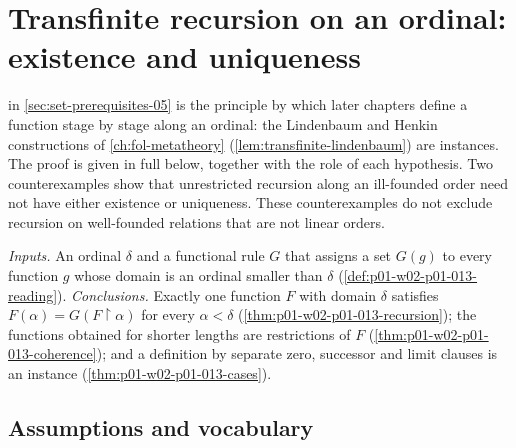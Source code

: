 \section{Transfinite recursion on an ordinal: existence and uniqueness}
\label{sec:p01-w02-p01-013-transfinite-recursion}

 in \cref{sec:set-prerequisites-05} is the
principle by which later chapters define a function stage by stage along an
ordinal: the Lindenbaum and Henkin constructions of
\cref{ch:fol-metatheory} (\cref{lem:transfinite-lindenbaum}) are instances.
The proof is given in full below, together with the role of each hypothesis.
Two counterexamples show that unrestricted recursion along an ill-founded
order need not have either existence or uniqueness. These counterexamples
do not exclude recursion on well-founded relations that are not linear
orders.

\emph{Inputs.} An ordinal \(\delta\) and a functional rule \(G\) that assigns
a set \(G(g)\) to every function \(g\) whose domain is an ordinal smaller
than \(\delta\) (\cref{def:p01-w02-p01-013-reading}).
\emph{Conclusions.} Exactly one function \(F\) with domain \(\delta\)
satisfies \(F(\alpha)=G(F\mathbin{\upharpoonright}\alpha)\) for every
\(\alpha<\delta\) (\cref{thm:p01-w02-p01-013-recursion}); the functions
obtained for shorter lengths are restrictions of \(F\)
(\cref{thm:p01-w02-p01-013-coherence}); and a definition by separate zero,
successor and limit clauses is an instance
(\cref{thm:p01-w02-p01-013-cases}).

\subsection{Assumptions and vocabulary}
\label{sec:p01-w02-p01-013-assumptions}

